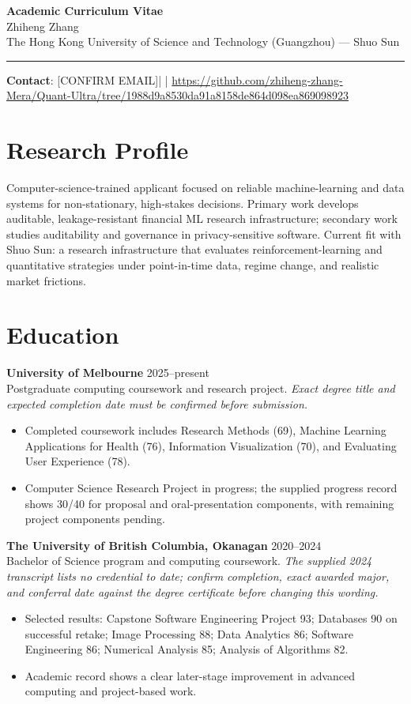\documentclass[11pt]{article}
\newcommand{\ApplicantName}{Zhiheng Zhang}
\newcommand{\ApplicantEmail}{[CONFIRM EMAIL]}
\newcommand{\ApplicantPhone}{[CONFIRM PHONE]}
\newcommand{\ApplicantGitHub}{\url{https://github.com/zhiheng-zhang-Mera/Quant-Ultra/tree/1988d9a8530da91a8158de864d098ea869098923}}
\begin{document}
\begin{center}
{\LARGE\bfseries Academic Curriculum Vitae}\\[0.25em]
{\large \ApplicantName}\\
The Hong Kong University of Science and Technology (Guangzhou) --- Shuo Sun
\end{center}
\vspace{0.35em}\hrule\vspace{0.65em}

\textbf{Contact}: \ApplicantEmail\quad | \quad \ApplicantPhone\quad | \quad \ApplicantGitHub

\section*{Research Profile}
Computer-science-trained applicant focused on reliable machine-learning and data systems for non-stationary, high-stakes decisions. Primary work develops auditable, leakage-resistant financial ML research infrastructure; secondary work studies auditability and governance in privacy-sensitive software. Current fit with Shuo Sun: a research infrastructure that evaluates reinforcement-learning and quantitative strategies under point-in-time data, regime change, and realistic market frictions.

\section*{Education}
\textbf{University of Melbourne} \hfill 2025--present\\
Postgraduate computing coursework and research project. \textit{Exact degree title and expected completion date must be confirmed before submission.}
\begin{itemize}
\item Completed coursework includes Research Methods (69), Machine Learning Applications for Health (76), Information Visualization (70), and Evaluating User Experience (78).
\item Computer Science Research Project in progress; the supplied progress record shows 30/40 for proposal and oral-presentation components, with remaining project components pending.
\end{itemize}

\textbf{The University of British Columbia, Okanagan} \hfill 2020--2024\\
Bachelor of Science program and computing coursework. \textit{The supplied 2024 transcript lists no credential to date; confirm completion, exact awarded major, and conferral date against the degree certificate before changing this wording.}
\begin{itemize}
\item Selected results: Capstone Software Engineering Project 93; Databases 90 on successful retake; Image Processing 88; Data Analytics 86; Software Engineering 86; Numerical Analysis 85; Analysis of Algorithms 82.
\item Academic record shows a clear later-stage improvement in advanced computing and project-based work.
\end{itemize}
\end{document}
